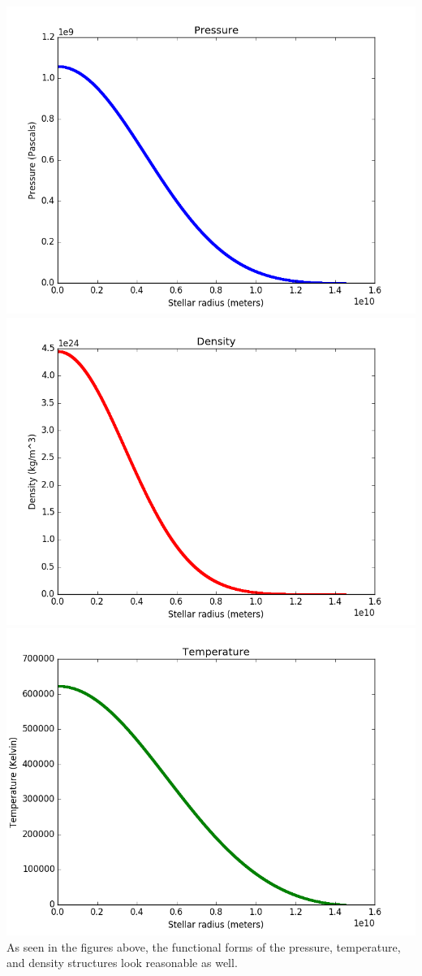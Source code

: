 \documentclass[12pt]{article}
\begin{document}
\includegraphics[scale=0.25]{pressure_r.png}
\includegraphics[scale=0.25]{rho_r.png}
\includegraphics[scale=0.25]{Temperature_r.png} \\


As seen in the figures above, the functional forms of the pressure, temperature, and density structures look reasonable as well.
\end{document}
